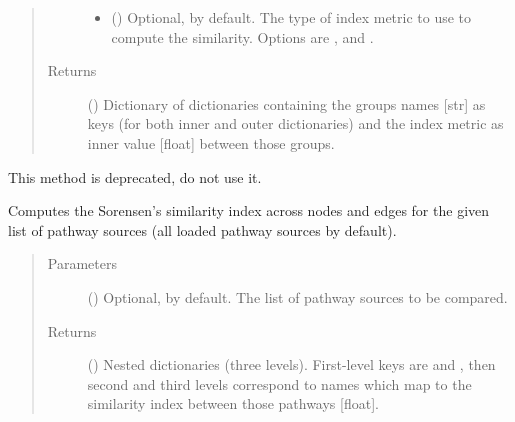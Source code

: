 \documentclass[letterpaper,10pt,english]{sphinxmanual}
\begin{document}
\begin{fulllineitems}
\begin{fulllineitems}
\begin{quote}
\begin{description}
\begin{itemize}
\item {} 
 () \textendash{} Optional,  by default. The type of index metric
to use to compute the similarity. Options are ,
 and .

\end{itemize}

\item[{Returns}] \leavevmode
() \textendash{} Dictionary of dictionaries containing the groups
names {[}str{]} as keys (for both inner and outer dictionaries)
and the index metric as inner value {[}float{]} between those
groups.

\end{description}\end{quote}

\end{fulllineitems}


\begin{fulllineitems}
\label{\detokenize{main:pypath.main.PyPath.small_plot}}
This method is deprecated, do not use it.

\end{fulllineitems}


\begin{fulllineitems}
\label{\detokenize{main:pypath.main.PyPath.sorensen_pathways}}
Computes the Sorensen’s similarity index across nodes and edges
for the given list of pathway sources (all loaded pathway
sources by default).
\begin{quote}\begin{description}
\item[{Parameters}] \leavevmode
{} () \textendash{} Optional,  by default. The list of pathway sources
to be compared.

\item[{Returns}] \leavevmode
() \textendash{} Nested dictionaries (three levels). First-level
keys are  and , then second and third
levels correspond to  names which map
to the similarity index between those pathways {[}float{]}.


\end{description}
\end{quote}
\end{fulllineitems}
\end{fulllineitems}
\end{document}
